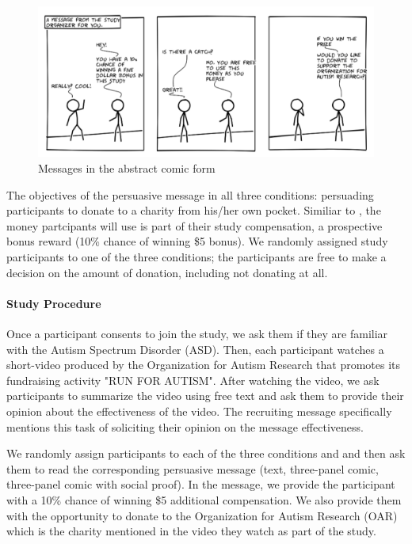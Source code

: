 \begin{figure}[bt]
	\centering
	\includegraphics[width=\columnwidth]{./figures/abstract_comic.png}
	\caption{Messages in the abstract comic form}
	\label{fig:basic three comic panel}
\end{figure}

The objectives of the persuasive message in all three conditions: persuading participants to donate to a charity from his/her own pocket. Similiar to \textcite{lee2013does}, the money partcipants will use is part of their study compensation, a prospective bonus reward (10\% chance of winning \$5 bonus). We randomly assigned study participants to one of the three conditions; the participants are free to make a decision on the amount of donation, including not donating at all.

\paragraph{Study Procedure} Once a participant consents to join the study, we ask them if they are  familiar with the Autism Spectrum Disorder (ASD). Then, each participant watches a short-video produced by the Organization for Autism Research that promotes its fundraising activity "RUN FOR AUTISM". After watching the video, we ask participants to summarize the video using free text and ask them to provide their opinion about the effectiveness of the video. The recruiting message specifically mentions this task of soliciting their opinion on the message effectiveness.

We randomly assign participants to each of the three conditions and and then ask them to read the corresponding persuasive message (text, three-panel comic, three-panel comic with social proof). In the message, we provide the participant with a 10\% chance of winning \$5 additional compensation. We also provide them with the opportunity to donate to the Organization for Autism Research (OAR) which is the charity mentioned in the video they watch as part of the study.

